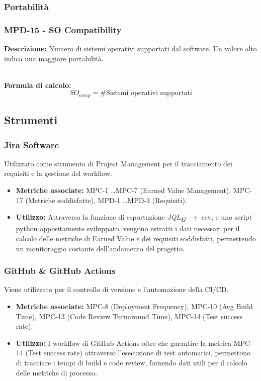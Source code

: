 \documentclass[a4paper,12pt]{article}
\newcommand{\glossario}[1]{\textit{#1}\textsubscript{\textbf{\textit{\textcolor{lightblack}{G}}}}}
\newcommand{\metricdef}[3]{
    \subsubsection*{#1 - #2}
    \textbf{Descrizione:} #3
}
\newcommand{\metricformula}[1]{
    \\[0.5em]
    \textbf{Formula di calcolo:}
    \begin{equation*}
        #1
    \end{equation*}
}
\begin{document}
\subsubsection{Portabilità}

\metricdef{MPD-15}{SO Compatibility}{Numero di sistemi operativi supportati dal software. Un valore alto indica una maggiore portabilità.}
\metricformula{SO_{comp} = \#\text{Sistemi operativi supportati}}

\subsection{Strumenti}
\subsubsection{Jira Software}
Utilizzato come strumento di Project Management per il tracciamento dei
requisiti e la gestione del workflow.
\begin{itemize}
    \item \textbf{Metriche associate:} MPC-1 \dots MPC-7 (Earned Value Management), MPC-17 (Metriche soddisfatte), MPD-1 \dots MPD-3 (Requisiti).
    \item \textbf{Utilizzo:} Attraverso la funzione di esportazione \glossario{JQL} $\rightarrow$ csv, e uno script python appositamente sviluppato, vengono estratti i dati necessari per il calcolo delle metriche di Earned Value e dei requisiti soddisfatti, permettendo un monitoraggio costante dell'andamento del progetto.
\end{itemize}

\subsubsection{GitHub \& GitHub Actions}
Viene utilizzato per il controllo di versione e l'automazione della CI/CD.
\begin{itemize}
    \item \textbf{Metriche associate:} MPC-8 (Deployment Frequency), MPC-10 (Avg Build Time), MPC-13 (Code Review Turnaround Time), MPC-14 (Test success rate).
    \item \textbf{Utilizzo:} I workflow di GitHub Actions oltre che garantire la metrica MPC-14 (Test success rate) attraverso l'esecuzione di test automatici, permettono di tracciare i tempi di build e code review, fornendo dati utili per il calcolo delle metriche di processo.
\end{itemize}
\end{document}
